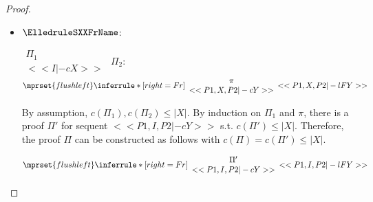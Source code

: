 \begin{proof}
\begin{enumerate}
\begin{itemize}
  \item $\ElledruleSXXFrName$:
    \begin{center}
      \scriptsize
      \begin{math}
        \begin{array}{c}
          \Pi_1 \\
          {<<I |-c X>>}
        \end{array}
      \end{math}
      \qquad\qquad
      $\Pi_2$:
      \begin{math}
        $$\mprset{flushleft}
        \inferrule* [right={\tiny Fr}] {
          {
            \begin{array}{c}
              \pi \\
              {<<P1, X, P2 |-c Y>>}
            \end{array}
          }
        }{<<P1, X, P2 |-l F Y>>}
      \end{math}
    \end{center}
    By assumption, $c(\Pi_1),c(\Pi_2)\leq |X|$. By induction on $\Pi_1$ and $\pi$, there is a
    proof $\Pi'$ for sequent $<<P1, I, P2 |-c Y>>$ s.t. $c(\Pi') \leq |X|$. Therefore, the
    proof $\Pi$ can be constructed as follows with $c(\Pi) = c(\Pi') \leq |X|$.
    \begin{center}
      \scriptsize
      \begin{math}
        $$\mprset{flushleft}
        \inferrule* [right={\tiny Fr}] {
          {
            \begin{array}{c}
              \Pi' \\
              {<<P1, I, P2 |-c Y>>}
            \end{array}
          }
        }{<<P1, I, P2 |-l F Y>>}
      \end{math}
    \end{center}


\end{itemize}
\end{enumerate}
\end{proof}
